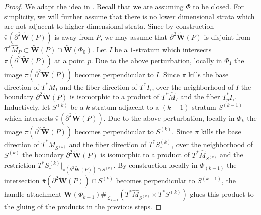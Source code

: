 \documentclass[10pt,a4paper]{amsart}
\newcommand{\bfW}{\mathbf{W}}
\newcommand{\cL}{\mathcal{L}}
\newcommand{\del}{\partial}
\begin{document}
\begin{proof}
We adapt the idea in
\cite[Example 1.33]{GPS2}.
Recall that
we are assuming
$\Phi$
to be closed.
For simplicity,
we will further assume that
there is no lower dimensional strata
which are not adjacent to higher dimensional strata.
Since by construction
$\bar{\pi}(\del^2 \widetilde{\bfW}(P))$
is away from
$P$,
we may assume that
$\del^2 \widetilde{\bfW}(P)$
is disjoint from
$T^* \widehat{M}_P
\subset
\widetilde{\bfW}(P)
\cap
\widetilde{\bfW}(\Phi_0)$.
Let
$I$
be a $1$-stratum
which intersects
$\bar{\pi}(\del^2 \widetilde{\bfW}(P))$
at a point
$p$.
Due to the above perturbation,
locally in
$\Phi_1$
the image
$\bar{\pi}(\del^2 \widetilde{\bfW}(P))$
becomes perpendicular to
$I$.
Since
$\bar{\pi}$
kills
the base direction of
$T^* \widehat{M}_I$
and
the fiber direction of
$T^* I_\circ$,
over the neighborhood of
$I$
the boundary
$\del^2 \widetilde{\bfW}(P)$
is isomorphic to a product of
$T^* \widehat{M}_I$
and
the fiber
$T^*_p I_\circ$.
Inductively,
let
$S^{(k)}$
be a $k$-stratum adjacent to a $(k-1)$-stratum
$S^{(k-1)}$
which intersects
$\bar{\pi}(\del^2 \widetilde{\bfW}(P))$.
Due to the above perturbation,
locally in
$\Phi_k$
the image
$\bar{\pi}(\del^2 \widetilde{\bfW}(P))$
becomes perpendicular to
$S^{(k)}$.
Since
$\bar{\pi}$
kills
the base direction of
$T^* \widehat{M}_{S^{(k)}}$
and
the fiber direction of
$T^* S^{(k)}_\circ$,
over the neighborhood of
$S^{(k)}$
the boundary
$\del^2 \widetilde{\bfW}(P)$
is isomorphic to a product of
$T^* \widehat{M}_{S^{(k)}}$
and
the restriction
$T^* S^{(k)}_\circ |_{\bar{\pi}(\del^2 \widetilde{\bfW}(P)) \cap S^{(k)}}$.
By construction locally in
$\Phi_{(k-1)}$
the intersection
$\bar{\pi}(\del^2 \widetilde{\bfW}(P)) \cap S^{(k)}$
becomes perpendicular to
$S^{(k-1)}$,
the handle attachment
$\bfW(\Phi_{k-1}) \#_{\cL_{k-1}} (T^* \widehat{M}_{S^{(k)}} \times T^* S^{(k)}_\circ)$
glues this product to the gluing of the products in the previous steps.


\end{proof}
\end{document}
